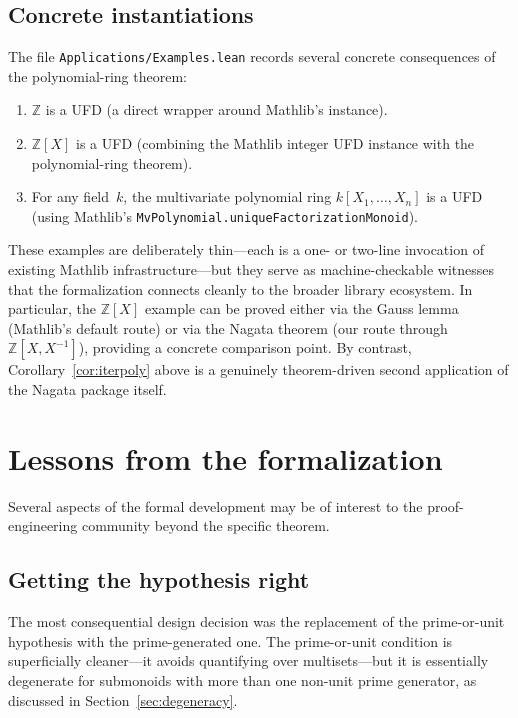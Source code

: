 \documentclass[11pt]{article}
\theoremstyle{plain}
\theoremstyle{definition}
\theoremstyle{remark}
\newcommand{\ZZ}{\mathbb{Z}}
\newcommand{\li}[1]{\texorpdfstring{\texttt{#1}}{#1}}
\newcommand{\lf}[1]{\texorpdfstring{\nolinkurl{#1}}{#1}}
\begin{document}
\subsection{Concrete instantiations}\label{sec:examples}

The file \lf{Applications/Examples.lean} records several concrete consequences
of the polynomial-ring theorem:

\begin{enumerate}[nosep]
\item $\ZZ$ is a UFD (a direct wrapper around Mathlib's instance).
\item $\ZZ[X]$ is a UFD (combining the Mathlib integer UFD instance with the
  polynomial-ring theorem).
\item For any field~$k$, the multivariate polynomial ring
  $k[X_1,\ldots,X_n]$ is a UFD (using Mathlib's
  \li{MvPolynomial.uniqueFactorizationMonoid}).
\end{enumerate}

\noindent
These examples are deliberately thin---each is a one- or two-line invocation
of existing Mathlib infrastructure---but they serve as machine-checkable
witnesses that the formalization connects cleanly to the broader library
ecosystem.  In particular, the $\ZZ[X]$ example can be proved either via the
Gauss lemma (Mathlib's default route) or via the Nagata theorem (our route
through $\ZZ[X,X^{-1}]$), providing a concrete comparison point.  By contrast,
Corollary~\ref{cor:iterpoly} above is a genuinely theorem-driven second
application of the Nagata package itself.


\section{Lessons from the formalization}\label{sec:lessons}

Several aspects of the formal development may be of interest to the
proof-engineering community beyond the specific theorem.

\subsection{Getting the hypothesis right}\label{sec:hyp-right}

The most consequential design decision was the replacement of the
prime-or-unit hypothesis with the prime-generated one.  The prime-or-unit
condition is superficially cleaner---it avoids quantifying over
multisets---but it is essentially degenerate for submonoids with more than one
non-unit prime generator, as discussed in Section~\ref{sec:degeneracy}.
\end{document}
